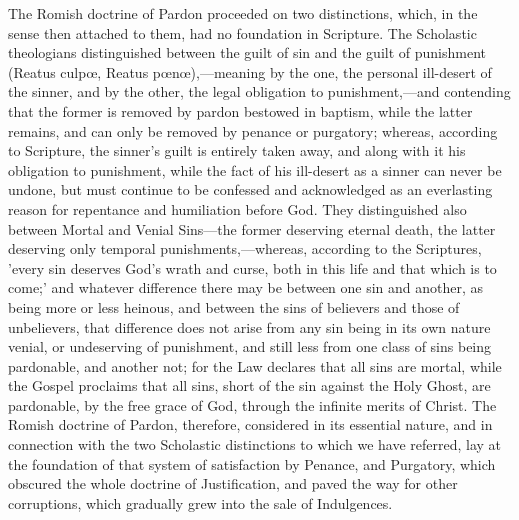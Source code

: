 \documentclass[
]{book}
\begin{document}
The Romish doctrine of Pardon proceeded on two distinctions, which, in the sense then attached to them, had no foundation in Scripture. The Scholastic theologians distinguished between the guilt of sin and the guilt of punishment (Reatus culpœ, Reatus pœnœ),---meaning by the one, the personal ill-desert of the sinner, and by the other, the legal obligation to punishment,---and contending that the former is removed by pardon bestowed in baptism, while the latter remains, and can only be removed by penance or purgatory; whereas, according to Scripture, the sinner's guilt is entirely taken away, and along with it his obligation to punishment, while the fact of his ill-desert as a sinner can never be undone, but must continue to be confessed and acknowledged as an everlasting reason for repentance and humiliation before God. They distinguished also between Mortal and Venial Sins---the former deserving eternal death, the latter deserving only temporal punishments,---whereas, according to the Scriptures, 'every sin deserves God's wrath and curse, both in this life and that which is to come;' and whatever difference there may be between one sin and another, as being more or less heinous, and between the sins of believers and those of unbelievers, that difference does not arise from any sin being in its own nature venial, or undeserving of punishment, and still less from one class of sins being pardonable, and another not; for the Law declares that all sins are mortal, while the Gospel proclaims that all sins, short of the sin against the Holy Ghost, are pardonable, by the free grace of God, through the infinite merits of Christ. The Romish doctrine of Pardon, therefore, considered in its essential nature, and in connection with the two Scholastic distinctions to which we have referred, lay at the foundation of that system of satisfaction by Penance, and Purgatory, which obscured the whole doctrine of Justification, and paved the way for other corruptions, which gradually grew into the sale of Indulgences.
\end{document}

